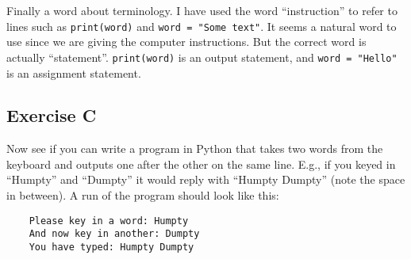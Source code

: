 Finally a word about terminology.  I have used the word ``instruction''
to refer to lines such as \verb!print(word)! and \verb!word = "Some text"!.
It seems a natural word to use since we are giving the computer instructions.
But the correct word is actually ``statement''.  \verb!print(word)! is
an output statement, and \verb!word = "Hello"! is an assignment statement.


\subsection*{Exercise C}

Now see if you can write a program in Python that takes
two words from the keyboard and outputs one after the other on the same line. 
E.g., if you keyed in ``Humpty'' and ``Dumpty'' 
it would reply with ``Humpty Dumpty'' (note the space in between).
A run of the program should look like this:

\begin{Verbatim}
    Please key in a word: Humpty
    And now key in another: Dumpty
    You have typed: Humpty Dumpty
\end{Verbatim}


 	


